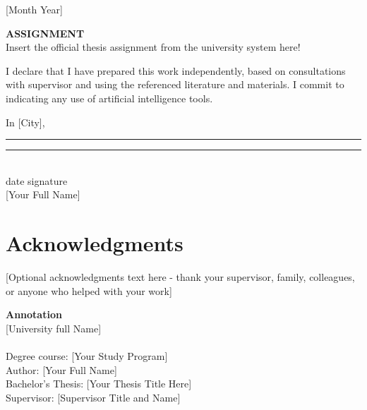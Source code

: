 \documentclass[11pt,a4paper,oneside]{book}
\newcommand{\thesistitle}{[Your Thesis Title Here]}
\newcommand{\authorname}{[Your Full Name]}
\newcommand{\studyprogram}{[Your Study Program]}
\newcommand{\universityName}{[University full Name]}
\newcommand{\facultName}{[Faculty full Name]}
\newcommand{\supervisor}{[Supervisor Title and Name]}
\newcommand{\submissiondate}{[Month Year]}
\begin{document}
\vfill

{\large \submissiondate}\\[0.5cm]
\newpage
\thispagestyle{empty}
\mbox{}

\newpage
\thispagestyle{empty}
\begin{center}
    \vspace*{3cm}
    {\Large \textbf{ASSIGNMENT}}\\[2cm]
    
    {\large Insert the official thesis assignment from the university system here!}\\[1cm]
    
\end{center}

\newpage
\thispagestyle{empty}
\mbox{}

\newpage
\thispagestyle{empty}
\vspace*{5cm}

I declare that I have prepared this work independently, based on consultations with supervisor and using the referenced literature and materials. I commit to indicating any use of artificial intelligence tools.

\vspace{3cm}

In [City], \rule{3cm}{0.4pt} \hfill \rule{4cm}{0.4pt}\\
\phantom{In [City], }date \hfill signature\\[0.5cm]
\hfill \authorname

\newpage
\thispagestyle{empty}
\mbox{}

\newpage
\thispagestyle{empty}
\vspace*{3cm}
\section*{Acknowledgments}

[Optional acknowledgments text here - thank your supervisor, family, colleagues, or anyone who helped with your work]

\newpage
\thispagestyle{empty}
\mbox{}

\newpage
\thispagestyle{empty}

\begin{flushleft}
{\large \textbf{Annotation}}\\[0.25cm]

\universityName\\
\facultName\\[0.5cm]

Degree course: \studyprogram\\
Author: \authorname\\
Bachelor's Thesis: \thesistitle\\
Supervisor: \supervisor\\
\submissiondate\\[1cm]
\end{flushleft}
\end{document}

